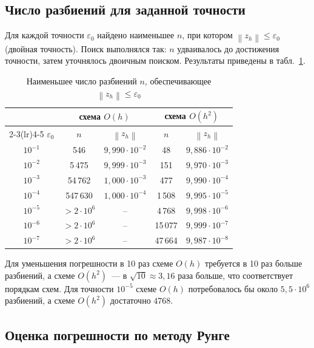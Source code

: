 \documentclass[12pt,a4paper]{article}
\newcommand{\norm}[1]{\left\lVert #1\right\rVert}
\begin{document}
\subsection{Число разбиений для заданной точности}

Для каждой точности $\varepsilon_0$ найдено наименьшее $n$, при котором
$\norm{z_h}\le\varepsilon_0$ (двойная точность). Поиск выполнялся так:
$n$ удваивалось до достижения точности, затем уточнялось двоичным
поиском. Результаты приведены в табл.~\ref{tab:nodes}.

\begin{table}[htbp]
\caption{Наименьшее число разбиений $n$, обеспечивающее
$\norm{z_h}\le\varepsilon_0$}
\label{tab:nodes}
\centering
\begin{tabular}{ccccc}
\toprule
& \multicolumn{2}{c}{схема $O(h)$} & \multicolumn{2}{c}{схема $O(h^2)$}\\
\cmidrule(lr){2-3}\cmidrule(lr){4-5}
$\varepsilon_0$ & $n$ & $\norm{z_h}$ & $n$ & $\norm{z_h}$\\
\midrule
$10^{-1}$ & 546      & $9{,}990\cdot10^{-2}$ & 48     & $9{,}886\cdot10^{-2}$\\
$10^{-2}$ & 5\,475   & $9{,}999\cdot10^{-3}$ & 151    & $9{,}970\cdot10^{-3}$\\
$10^{-3}$ & 54\,762  & $1{,}000\cdot10^{-3}$ & 477    & $9{,}990\cdot10^{-4}$\\
$10^{-4}$ & 547\,630 & $1{,}000\cdot10^{-4}$ & 1\,508 & $9{,}995\cdot10^{-5}$\\
$10^{-5}$ & $>2\cdot10^6$ & --              & 4\,768 & $9{,}998\cdot10^{-6}$\\
$10^{-6}$ & $>2\cdot10^6$ & --              & 15\,077 & $9{,}999\cdot10^{-7}$\\
$10^{-7}$ & $>2\cdot10^6$ & --              & 47\,664 & $9{,}987\cdot10^{-8}$\\
\bottomrule
\end{tabular}
\end{table}

Для уменьшения погрешности в 10 раз схеме $O(h)$ требуется в 10 раз
больше разбиений, а схеме $O(h^2)$~--- в $\sqrt{10}\approx3{,}16$ раза
больше, что соответствует порядкам схем. Для точности $10^{-5}$ схеме
$O(h)$ потребовалось бы около $5{,}5\cdot10^6$ разбиений, а схеме
$O(h^2)$ достаточно $4768$.

\subsection{Оценка погрешности по методу Рунге}
\end{document}
